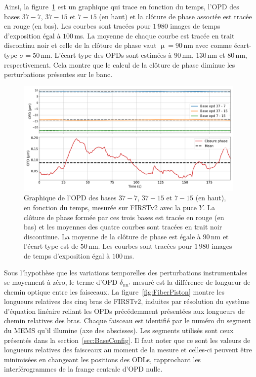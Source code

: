 Ainsi, la figure~\ref{fig:OPDfitVStime} est un graphique qui trace en fonction du temps, l'\ac{OPD} des bases $37-7$, $37-15$ et $7-15$ (en haut) et la clôture de phase \citep{weigelt1977, lohmann1983} associée est tracée en rouge (en bas). Les courbes sont tracées pour $1\,980$ images de temps d'exposition égal à $100 \,$ms. La moyenne de chaque courbe est tracée en trait discontinu noir et celle de la clôture de phase vaut $\upmu = 90 \,$nm avec comme écart-type $\sigma = 50 \,$nm. L'écart-type des \ac{OPD}s sont estimées à $90 \,$nm, $130 \,$nm et $80 \,$nm, respectivement. Cela montre que le calcul de la clôture de phase diminue les perturbations présentes sur le banc.

\begin{figure}[ht!]
    \centering
    \includegraphics[width=\figwidth]{Figure_Chap3/20221010_FullOnData_OPDFitCPvsTime_CP2_Pola1_Base_LaTex.png}
    \caption[Graphique de l'OPD de trois bases et de la clôture de phase en fonction du temps, mesurée sur FIRSTv2 avec la puce $Y$.]{Graphique de l'OPD des bases $37-7$, $37-15$ et $7-15$ (en haut), en fonction du temps, mesurée sur FIRSTv2 avec la puce $Y$. La clôture de phase formée par ces trois bases est tracée en rouge (en bas) et les moyennes des quatre courbes sont tracées en trait noir discontinue. La moyenne de la clôture de phase est égale à $90 \,$nm et l'écart-type est de $50 \,$nm. Les courbes sont tracées pour $1\,980$ images de temps d'exposition égal à $100 \,$ms.}
    \label{fig:OPDfitVStime}
\end{figure}

Sous l'hypothèse que les variations temporelles des perturbations instrumentales se moyennent à zéro, le terme d'\ac{OPD} $\delta_{nn'}$ mesuré est la différence de longueur de chemin optique entre les faisceaux. La figure~\ref{fig:FiberPiston} montre les longueurs relatives des cinq bras de \ac{FIRSTv2}, induites par résolution du système d'équation linéaire reliant les \ac{OPD}s précédemment présentées aux longueurs de chemin relatives des bras. Chaque faisceau est identifié par le numéro du segment du \ac{MEMS} qu'il illumine (axe des abscisses). Les segments utilisés sont ceux présentés dans la section~\ref{sec:BaseConfig}. Il faut noter que ce sont les valeurs de longueurs relatives des faisceaux au moment de la mesure et celles-ci peuvent être minimisées en changeant les positions des \ac{ODL}s, rapprochant les interférogrammes de la frange centrale d'\ac{OPD} nulle.

